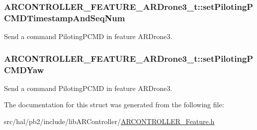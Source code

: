 \subsubsection[{\texorpdfstring{set\+Piloting\+P\+C\+M\+D\+Timestamp\+And\+Seq\+Num}{setPilotingPCMDTimestampAndSeqNum}}]{ A\+R\+C\+O\+N\+T\+R\+O\+L\+L\+E\+R\+\_\+\+F\+E\+A\+T\+U\+R\+E\+\_\+\+A\+R\+Drone3\+\_\+t\+::set\+Piloting\+P\+C\+M\+D\+Timestamp\+And\+Seq\+Num}\hypertarget{struct_a_r_c_o_n_t_r_o_l_l_e_r___f_e_a_t_u_r_e___a_r_drone3__t_a9098c38c4466bf6066d23a401c3c009e}{}\label{struct_a_r_c_o_n_t_r_o_l_l_e_r___f_e_a_t_u_r_e___a_r_drone3__t_a9098c38c4466bf6066d23a401c3c009e}
Send a command {\ttfamily Piloting\+P\+C\+MD} in feature {\ttfamily A\+R\+Drone3}. 
\subsubsection[{\texorpdfstring{set\+Piloting\+P\+C\+M\+D\+Yaw}{setPilotingPCMDYaw}}]{ A\+R\+C\+O\+N\+T\+R\+O\+L\+L\+E\+R\+\_\+\+F\+E\+A\+T\+U\+R\+E\+\_\+\+A\+R\+Drone3\+\_\+t\+::set\+Piloting\+P\+C\+M\+D\+Yaw}\hypertarget{struct_a_r_c_o_n_t_r_o_l_l_e_r___f_e_a_t_u_r_e___a_r_drone3__t_ab8213dda1eaaa1714330e236d335349b}{}\label{struct_a_r_c_o_n_t_r_o_l_l_e_r___f_e_a_t_u_r_e___a_r_drone3__t_ab8213dda1eaaa1714330e236d335349b}
Send a command {\ttfamily Piloting\+P\+C\+MD} in feature {\ttfamily A\+R\+Drone3}. 

The documentation for this struct was generated from the following file\+:\begin{DoxyCompactItemize}
\item 
src/hal/pb2/include/lib\+A\+R\+Controller/\hyperlink{_a_r_c_o_n_t_r_o_l_l_e_r___feature_8h}{A\+R\+C\+O\+N\+T\+R\+O\+L\+L\+E\+R\+\_\+\+Feature.\+h}\end{DoxyCompactItemize}
